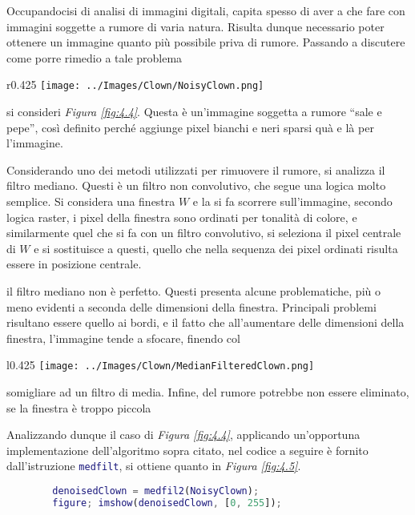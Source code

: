 \documentclass{subfiles}
\begin{document}
Occupandocisi di analisi di immagini digitali, capita spesso di aver a che fare con immagini soggette a rumore di varia natura.
Risulta dunque necessario poter ottenere un immagine quanto più possibile priva di rumore.
Passando a discutere come porre rimedio a tale problema
\begin{wrapfigure}{r}{0.425\textwidth}
    \centering
    \texttt{[image: ../Images/Clown/NoisyClown.png]}
    \caption{Clown soggetto a rumore.}
    \label{fig:4.4}
\end{wrapfigure}
si consideri \emph{Figura \ref{fig:4.4}}.
Questa è un'immagine soggetta a rumore ``sale e pepe'', così definito perché aggiunge pixel bianchi e neri sparsi quà e là per l'immagine.

Considerando uno dei metodi utilizzati per rimuovere il rumore, si analizza il filtro mediano.
Questi è un filtro non convolutivo, che segue una logica molto semplice.  Si considera una finestra \(W\) e la si fa scorrere sull'immagine,
secondo logica raster, i pixel della finestra sono ordinati per tonalità di colore, e similarmente quel che si fa con un filtro convolutivo,
si seleziona il pixel centrale di \(W\) e si sostituisce a questi, quello che nella sequenza dei pixel ordinati risulta essere in posizione centrale.

\begin{Remark*}
    il filtro mediano non è perfetto. Questi presenta alcune problematiche, più o meno evidenti a seconda delle dimensioni della finestra.
    Principali problemi risultano essere quello ai bordi, e il fatto che all'aumentare delle dimensioni della finestra, l'immagine tende a sfocare,
    finendo col
    \begin{wrapfigure}{l}{0.425\textwidth}
        \centering
        \texttt{[image: ../Images/Clown/MedianFilteredClown.png]}
        \caption{Filtro mediano applicato a \emph{Figura \ref{fig:4.4}}.}
        \label{fig:4.5}
    \end{wrapfigure}
    somigliare ad un filtro di media. Infine, del rumore potrebbe non essere eliminato, se la finestra è troppo piccola
\end{Remark*}

Analizzando dunque il caso di \emph{Figura \ref{fig:4.4}}, applicando un'opportuna implementazione dell'algoritmo sopra citato,
nel codice a seguire è fornito dall'istruzione \lstinline[language = MATLAB]{medfilt}, si ottiene quanto in \emph{Figura \ref{fig:4.5}}.
\begin{center}
    \begin{lstlisting}[language = MATLAB]
        % caricamento dell'immagine con rumore
        denoisedClown = medfil2(NoisyClown);
        figure; imshow(denoisedClown, [0, 255]);        
    \end{lstlisting}
\end{center}
\end{document}
